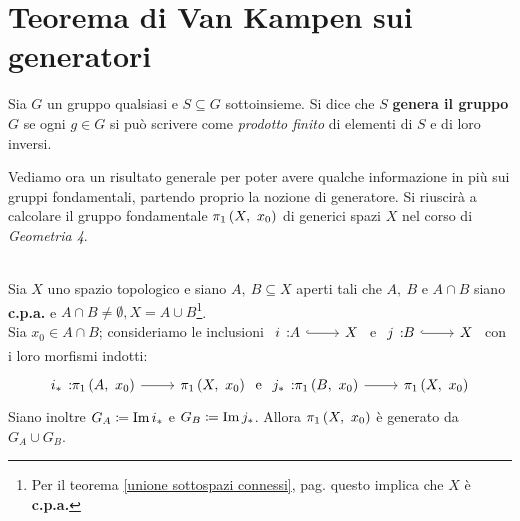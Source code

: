 \section{Teorema di Van Kampen sui generatori}
\begin{remember}
	Sia $G$ un gruppo qualsiasi e $S\subseteq G$ sottoinsieme. Si dice che $S$ \textbf{genera il gruppo} $G$ se ogni $g\in G$ si può scrivere come \textit{prodotto finito} di elementi di $S$ e di loro inversi.
\end{remember}
Vediamo ora un risultato generale per poter avere qualche informazione in più sui gruppi fondamentali, partendo proprio la nozione di generatore. Si riuscirà a calcolare il gruppo fondamentale $\gruf{X}{x_0}$ di generici spazi $X$ nel corso di \textit{Geometria 4}.
\begin{theorema}~{}\label{Van Kampen}\\
Sia $X$ uno spazio topologico e siano $A,\ B\subseteq X$ aperti tali che $A,\ B$ e $A\cap B$ siano \textbf{c.p.a.} e $A\cap B\neq\emptyset, X=A\cup B$\footnote{Per il teorema \ref{unione sottospazi connessi}, pag. \pageref{unione sottospazi connessi} questo implica che $X$ è \textbf{c.p.a.}}.\\
Sia $x_0\in A\cap B$; consideriamo le inclusioni $\incl i A X$ e $\incl j B X$ con i loro morfismi indotti:
	\begin{equation}
		\funz {i_\ast} {\gruf{A}{x_0}} {\gruf{X}{x_0}}\text{ e }\funz {j_\ast} {\gruf{B}{x_0}} {\gruf{X}{x_0}}
	\end{equation}
	Siano inoltre $G_A\coloneqq \operatorname{Im} i_\ast$ e $G_B\coloneqq \operatorname{Im} j_\ast$. Allora $\gruf{X}{x_0}$ è generato da $G_A\cup G_B$.
\end{theorema}
